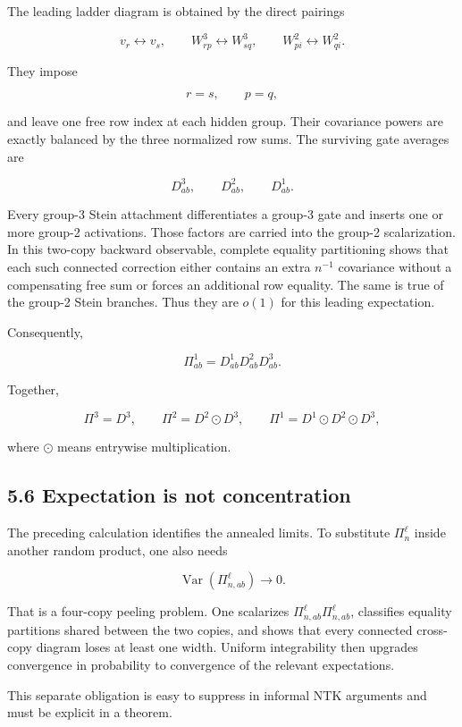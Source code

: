 The leading ladder diagram is obtained by the direct pairings

\[
v_r\leftrightarrow v_s,
\qquad
W^3_{rp}\leftrightarrow W^3_{sq},
\qquad
W^2_{pi}\leftrightarrow W^2_{qi}.
\]


They impose

\[
r=s,
\qquad
p=q,
\]


and leave one free row index at each hidden group. Their covariance powers are
exactly balanced by the three normalized row sums. The surviving gate
averages are

\[
D^3_{ab},\qquad D^2_{ab},\qquad D^1_{ab}.
\]


Every group-3 Stein attachment differentiates a group-3 gate and inserts one
or more group-2 activations. Those factors are carried into the group-2
scalarization. In this two-copy backward observable, complete equality
partitioning shows that each such connected correction either contains an
extra \(n^{-1}\) covariance without a compensating free sum or forces an
additional row equality. The same is true of the group-2 Stein branches.
Thus they are \(o(1)\) for this leading expectation.

Consequently,

\[
\boxed{
\Pi^1_{ab}=D^1_{ab}D^2_{ab}D^3_{ab}.
}
\]


Together,

\[
\boxed{
\Pi^3=D^3,\qquad
\Pi^2=D^2\odot D^3,\qquad
\Pi^1=D^1\odot D^2\odot D^3,
}
\]


where \(\odot\) means entrywise multiplication.

\subsection*{5.6 Expectation is not concentration}


The preceding calculation identifies the annealed limits. To substitute
\(\Pi_n^\ell\) inside another random product, one also needs

\[
\operatorname{Var}(\Pi^\ell_{n,ab})\longrightarrow0.
\]


That is a four-copy peeling problem. One scalarizes
\(\Pi^\ell_{n,ab}\Pi^\ell_{n,ab}\), classifies equality partitions shared
between the two copies, and shows that every connected cross-copy diagram
loses at least one width. Uniform integrability then upgrades convergence in
probability to convergence of the relevant expectations.

This separate obligation is easy to suppress in informal NTK arguments and
must be explicit in a theorem.

